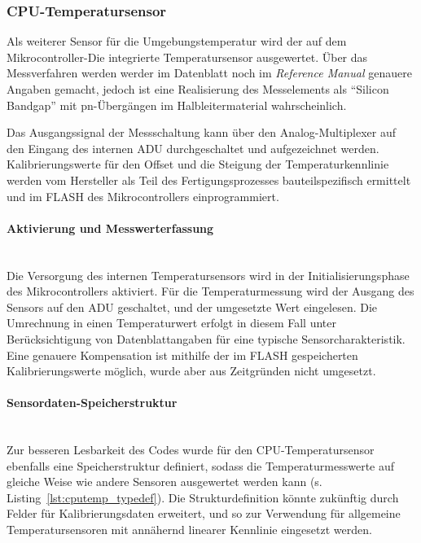         \subsubsection{CPU-Temperatursensor}
            Als weiterer Sensor für die Umgebungstemperatur wird der auf dem Mikrocontroller-Die integrierte Temperatursensor ausgewertet. Über das Messverfahren werden werder im Datenblatt noch im \emph{Reference Manual} genauere Angaben gemacht, jedoch ist eine Realisierung des Messelements als ``Silicon Bandgap'' mit pn-Übergängen im Halbleitermaterial wahrscheinlich.
            
            Das Ausgangssignal der Messschaltung kann über den Analog-Multiplexer auf den Eingang des internen ADU durchgeschaltet und aufgezeichnet werden. Kalibrierungswerte für den Offset und die Steigung der Temperaturkennlinie werden vom Hersteller als Teil des Fertigungsprozesses bauteilspezifisch ermittelt und im FLASH des Mikrocontrollers einprogrammiert.
            
            \paragraph{Aktivierung und Messwerterfassung}\mbox{}\\
            Die Versorgung des internen Temperatursensors wird in der Initialisierungsphase des Mikrocontrollers aktiviert. Für die Temperaturmessung wird der Ausgang des Sensors auf den ADU geschaltet, und der umgesetzte Wert eingelesen. Die Umrechnung in einen Temperaturwert erfolgt in diesem Fall unter Berücksichtigung von Datenblattangaben für eine typische Sensorcharakteristik. Eine genauere Kompensation ist mithilfe der im FLASH gespeicherten Kalibrierungswerte möglich, wurde aber aus Zeitgründen nicht umgesetzt.
            
            \paragraph{Sensordaten-Speicherstruktur}\mbox{}\\
            Zur besseren Lesbarkeit des Codes wurde für den CPU-Temperatursensor ebenfalls eine Speicherstruktur definiert, sodass die Temperaturmesswerte auf gleiche Weise wie andere Sensoren ausgewertet werden kann (s. Listing~\ref{lst:cputemp_typedef}). Die Strukturdefinition könnte zukünftig durch Felder für Kalibrierungsdaten erweitert, und so zur Verwendung für allgemeine Temperatursensoren mit annähernd linearer Kennlinie eingesetzt werden.
            

